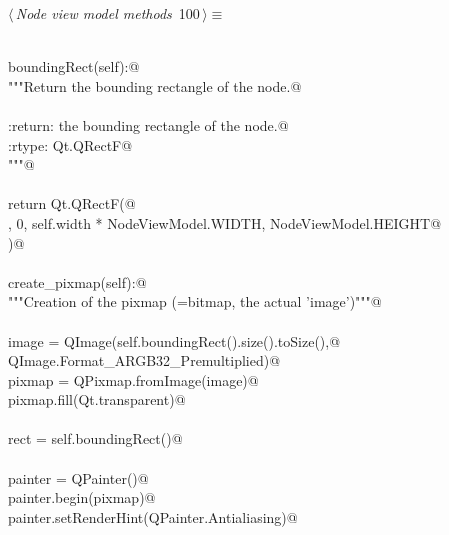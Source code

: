 \documentclass[
    a4paper,      %
    10pt,         %
    openright,    %
    notitlepage,  %
    parskip=half, %
]{scrreprt}       %
\theoremstyle{definition}                    %
\begin{document}
\begin{flushleft} \small
\begin{minipage}{\linewidth}\label{scrap161}\raggedright\small
{} $\langle\,${\itshape Node view model methods}\nobreak\ {\footnotesize {100}}$\,\rangle\equiv$
\vspace{-1exm}
\begin{list}{}{} \item
\mbox{}\lstinline@@\\
\mbox{}\lstinline@def boundingRect(self):@\\
\mbox{}\lstinline@    """Return the bounding rectangle of the node.@\\
\mbox{}\lstinline@@\\
\mbox{}\lstinline@    :return: the bounding rectangle of the node.@\\
\mbox{}\lstinline@    :rtype: Qt.QRectF@\\
\mbox{}\lstinline@    """@\\
\mbox{}\lstinline@@\\
\mbox{}\lstinline@    return Qt.QRectF(@\\
\mbox{}, 0, self.width * NodeViewModel.WIDTH, NodeViewModel.HEIGHT@\\
\mbox{}\lstinline@    )@\\
\mbox{}\lstinline@@\\
\mbox{}\lstinline@def create_pixmap(self):@\\
\mbox{}\lstinline@    """Creation of the pixmap (=bitmap, the actual 'image')"""@\\
\mbox{}\lstinline@@\\
\mbox{}\lstinline@    image = QImage(self.boundingRect().size().toSize(),@\\
\mbox{}\lstinline@                    QImage.Format_ARGB32_Premultiplied)@\\
\mbox{}\lstinline@    pixmap = QPixmap.fromImage(image)@\\
\mbox{}\lstinline@    pixmap.fill(Qt.transparent)@\\
\mbox{}\lstinline@@\\
\mbox{}\lstinline@    rect = self.boundingRect()@\\
\mbox{}\lstinline@@\\
\mbox{}\lstinline@    painter = QPainter()@\\
\mbox{}\lstinline@    painter.begin(pixmap)@\\
\mbox{}\lstinline@    painter.setRenderHint(QPainter.Antialiasing)@\\

\end{list}
\end{minipage}
\end{flushleft}
\end{document}
